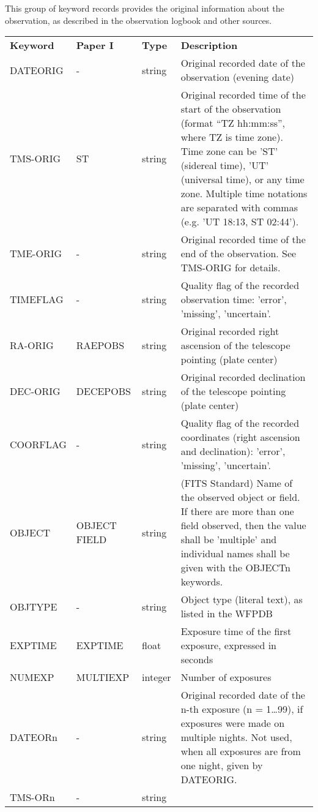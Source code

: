 \documentclass[11pt]{ivoa}
\begin{document}
This group of keyword records provides the original information about
the observation, as described in the observation logbook and other
sources.

\begingroup
\footnotesize
\begin{longtable}{lllp{}}
\sptablerule
\textbf{Keyword}&\textbf{Paper
I}&\textbf{Type}&\textbf{Description}\\
\sptablerule
\endhead
DATEORIG  &-        &string  &
  Original recorded date of the observation (evening date)\\
TMS-ORIG  &ST       &string  &
  Original recorded time of the start of the observation (format ``TZ
  hh:mm:ss'', where TZ is time zone). Time zone can be 'ST' (sidereal
  time), 'UT' (universal time), or any time zone.  Multiple time
  notations are separated with commas (e.g. 'UT 18:13, ST 02:44').\\
TME-ORIG  &-        &string  &
  Original recorded time of the end of the observation. See TMS-ORIG for details.\\
TIMEFLAG  &-        &string  &
  Quality flag of the recorded observation time: 'error', 'missing', 'uncertain'.\\
RA-ORIG   &RAEPOBS  &string  &
  Original recorded right ascension of the telescope pointing (plate center)\\
DEC-ORIG  &DECEPOBS &string  &
  Original recorded declination of the telescope pointing (plate center)\\
COORFLAG  &-        &string  &
  Quality flag of the recorded coordinates (right ascension and
  declination): 'error', 'missing', 'uncertain'.\\
OBJECT    &OBJECT FIELD &string &
  (FITS Standard) Name of the observed object or field. If there are
  more than one field observed, then the value shall be 'multiple' and
  individual names shall be given with the OBJECTn keywords.\\
OBJTYPE   &-        &string  &
  Object type (literal text), as listed in the WFPDB\\
EXPTIME   &EXPTIME  &float   &
  Exposure time of the first exposure, expressed in seconds\\
NUMEXP    &MULTIEXP &integer &Number of exposures\\
DATEORn   &-        &string  &
  Original recorded date of the n-th exposure (n = 1…99), if exposures
  were made on multiple nights. Not used, when all exposures are from
  one night, given by DATEORIG.\\
TMS-ORn   &-        &string  &

\end{longtable}
\end{document}
